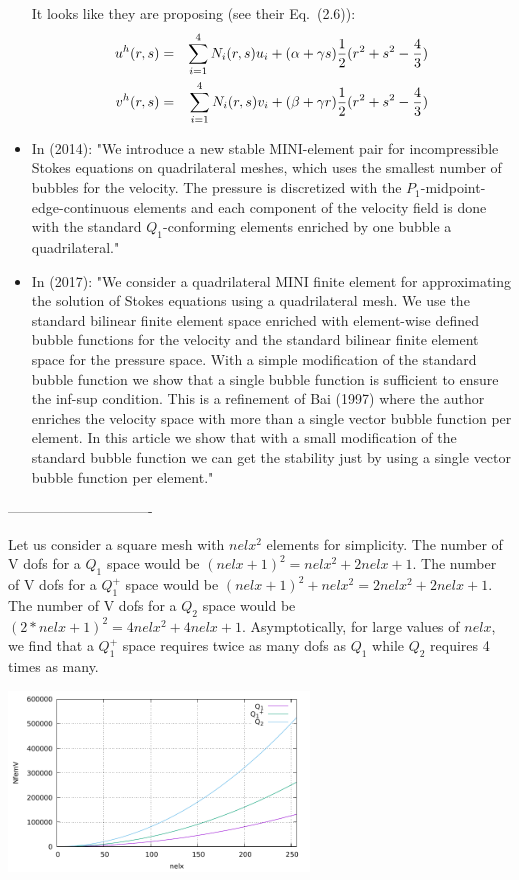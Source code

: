 \begin{itemize}
It looks like they are proposing (see their Eq.~(2.6)):
\begin{eqnarray}
u^h(r,s) &=& \sum_{i=1}^4 N_i (r,s) u_i + (\alpha + \gamma s)\frac{1}{2}(r^2+s^2-\frac43) \nonumber\\ 
v^h(r,s) &=& \sum_{i=1}^4 N_i (r,s) v_i + (\beta + \gamma r) \frac{1}{2}(r^2+s^2-\frac43)  
\end{eqnarray}

\item In \textcite{kwpa14} (2014): 
"We introduce a new stable MINI-element pair for incompressible Stokes equations on
quadrilateral meshes, which uses the smallest number of bubbles for the velocity. The pressure is 
discretized with the $P_1$-midpoint-edge-continuous elements and each component of the velocity field is
done with the standard $Q_1$-conforming elements enriched by one bubble a quadrilateral."

\item  In \textcite{lami17} (2017): "We consider a quadrilateral MINI
finite element for approximating the solution
of Stokes equations using a quadrilateral mesh. We use the standard bilinear finite
element space enriched with element-wise defined bubble functions for the velocity
and the standard bilinear finite element space for the pressure space. With a simple
modification of the standard bubble function we show that a single bubble function is
sufficient to ensure the inf-sup condition.
This is a refinement of Bai (1997) \cite{bai97} where the author enriches the velocity space with
more than a single vector bubble function per element. In this article we show that 
with a small modification of the standard bubble function we can get the stability just 
by using a single vector bubble function per element."



\end{itemize}

-------------------------------

Let us consider a square mesh with $nelx^2$ elements for simplicity. 
The number of V dofs for a $Q_1$ space would be $(nelx+1)^2=nelx^2 + 2nelx + 1$.
The number of V dofs for a $Q_1^+$ space would be $(nelx+1)^2+nelx^2=2nelx^2 + 2nelx + 1$.
The number of V dofs for a $Q_2$ space would be $(2*nelx+1)^2=4nelx^2 + 4nelx +1$.
Asymptotically, for large values of $nelx$, we find that a $Q_1^+$ space requires twice as many dofs as $Q_1$
while $Q_2$ requires 4 times as many.

\begin{center}
\includegraphics[width=8cm]{images/basis_q1p/NfemV_2D.pdf}
\end{center}





